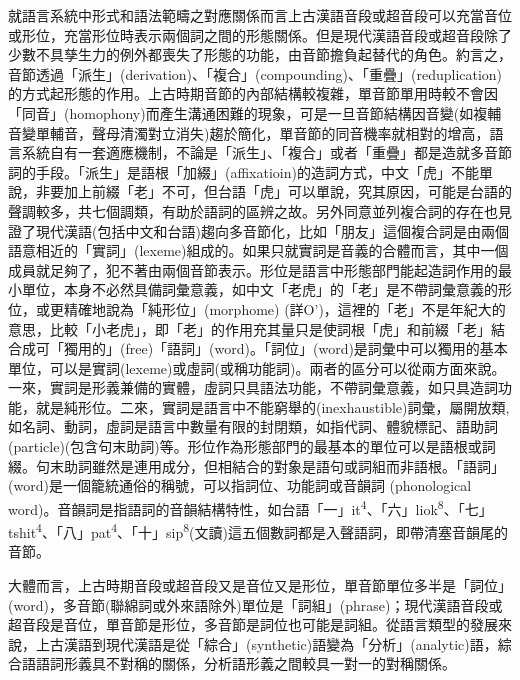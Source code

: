 \textrm{就語言系統中形式和語法範疇之對應關係而言上古漢語音段或超音段可以充當音位或形位，充當形位時表示兩個詞之間的形態關係。但是現代漢語音段或超音段除了少數不具孳生力的例外都喪失了形態的功能，由音節擔負起替代的角色。約言之，音節透過「派生」(derivation)}、\textrm{「複合」(compounding)}、\textrm{「重疊」(reduplication)的方式起形態的作用。上古時期音節的內部結構較複雜，單音節單用時較不會因「同音」(homophony)而產生溝通困難的現象，可是一旦音節結構因音變(如複輔音變單輔音，聲母清濁對立消失)趨於簡化，單音節的同音機率就相對的增高，語言系統自有一套適應機制，不論是「派生」、「複合」或者「重疊」都是造就多音節詞的手段。「派生」是語根「加綴」(affixatioin)的造詞方式，中文「虎」不能單說，非要加上前綴「老」不可，但台語「虎」可以單說，究其原因，可能是台語的聲調較多，共七個調類，有助於語詞的區辨之故。另外同意並列複合詞的存在也見證了現代漢語(包括中文和台語)趨向多音節化，比如「朋友」這個複合詞是由兩個語意相近的「實詞」(lexeme)組成的。如果只就實詞是音義的合體而言，其中一個成員就足夠了}，\textrm{犯不著由兩個音節表示。形位是語言中形態部門能起造詞作用的最小單位，本身不必然具備詞彙意義，如中文「老虎」的「老」是不帶詞彙意義的形位，或更精確地說為「純形位」(morphome) (詳O’\citealt{Neill2013})}，\textrm{這裡的「老」不是年紀大的意思，比較「小老虎」，即「老」的作用充其量只是使詞根「虎」和前綴「老」結合成可「獨用的」(free)「語詞」(word)}。\textrm{「詞位」(word)是詞彙中可以獨用的基本單位}，\textrm{可以是實詞(lexeme)或虛詞(或稱功能詞)}。\textrm{兩者的區分可以從兩方面來說}。\textrm{一來}，\textrm{實詞是形義兼備的實體}，\textrm{虛詞只具語法功能}，\textrm{不帶詞彙意義}，\textrm{如只具造詞功能}，\textrm{就是純形位}。\textrm{二來}，\textrm{實詞是語言中不能窮舉的(inexhaustible)詞彙}，\textrm{屬開放類, 如名詞、動詞，虛詞是語言中數量有限的封閉類}，\textrm{如指代詞}、\textrm{體貌標記}、\textrm{語助詞(particle)(包含句末助詞)等}。\textrm{形位作為形態部門的最基本的單位可以是語根或詞綴}。\textrm{句末助詞雖然是連用成分}，\textrm{但相結合的對象是語句或詞組而非語根}。\textrm{「語詞」(word)是一個籠統通俗的稱號，可以指詞位、功能詞或音韻詞 (phonological word)}。\textrm{音韻詞是指語詞的音韻結構特性，如台語「一」it}\textrm{\textsuperscript{4}}\textrm{、「六」liok}\textrm{\textsuperscript{8}}\textrm{、「七」tshit}\textrm{\textsuperscript{4}}\textrm{、「八」pat}\textrm{\textsuperscript{4}}\textrm{、「十」sip}\textrm{\textsuperscript{8}}\textrm{(文讀)這五個數詞都是入聲語詞，即帶清塞音韻尾的音節。}

\textrm{大體而言，上古時期音段或超音段又是音位又是形位，單音節單位多半是「詞位」(word)}，\textrm{多音節(聯綿詞或外來語除外)單位是「詞組」(phrase)}；\textrm{現代漢語音段或超音段是音位，單音節是形位，多音節是詞位也可能是詞組。從語言類型的發展來說，上古漢語到現代漢語是從「綜合」(synthetic)語變為「分析」(analytic)語，綜合語語詞形義具不對稱的關係，分析語形義之間較具一對一的對稱關係。}

